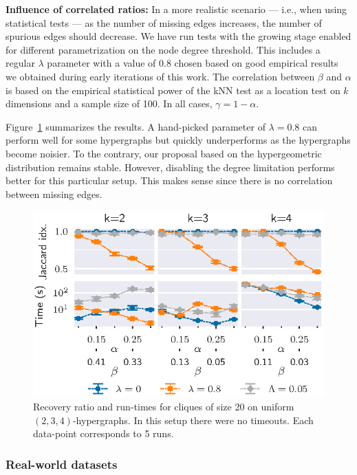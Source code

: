 \textbf{Influence of correlated ratios:}
In a more realistic scenario --- i.e., when using statistical tests --- as the number of missing edges
increases, the number of spurious edges should decrease.
We have run tests with the growing stage enabled for different parametrization on the node degree
threshold. This includes a regular $\lambda$ parameter with a value of $0.8$ chosen based on
good empirical results we obtained during early iterations of this work.
The correlation between $\beta$ and $\alpha$ is based on the empirical statistical power of the
kNN test as a location test on $k$ dimensions and a sample size of 100.
In all cases, $\gamma = 1 - \alpha$.

Figure~\ref{fig:hyper_ab_corr} summarizes the results. A hand-picked parameter of $\lambda = 0.8$ can
perform well for some hypergraphs but quickly underperforms as the hypergraphs become noisier.
To the contrary, our proposal based on the hypergeometric distribution remains stable.
However, disabling the degree limitation performs better for this particular setup.
This makes sense since there is no correlation between missing edges.

\begin{figure}[ht]
    \centering
    \includegraphics{images/presq/quasi_corr_20}
    \caption{
    Recovery ratio and run-times for cliques of size 20 on uniform $(2,3,4)$-hypergraphs.
    In this setup there were no timeouts. Each data-point corresponds to 5 runs.
    }
    \label{fig:hyper_ab_corr}
\end{figure}

\subsubsection{Real-world datasets}
\label{sec:results_real}

